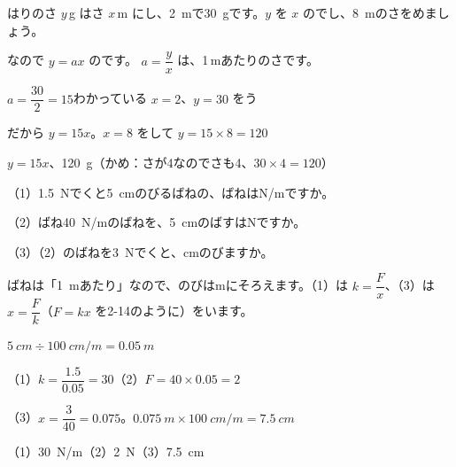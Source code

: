 \begin{kotoba}
\small
{}
\end{kotoba}


\begin{reidai}[\R{比例}{ひ|れい}の\R{式}{しき}を\R{作}{つく}る]
はりのさ $y$\,g はさ $x$\,m にし、\qty{2}{m}で\qty{30}{g}です。$y$ を $x$ のでし、\qty{8}{m}のさをめましょう。\par
\kangaekata {}なので $y=ax$ のです。 $a=\dfrac{y}{x}$ は、1\,mあたりのさです。\par
\shiki $a=\dfrac{30}{2}=15$\quad わかっている $x=2$、$y=30$ をう\par
\hspace*{2.6\zw}だから $y=15x$。$x=8$ をして $y=15\times8=120$\par
\kotae $y=15x$、\qty{120}{g}（かめ：さが4なのでさも4、$30\times4=120$）
\end{reidai}

\begin{reidai}[ばねの\R{力}{ちから} $F=kx$]
（1）\qty{1.5}{N}でくと\qty{5}{cm}のびるばねの、ばねはN/mですか。\par
（2）ばね\qty{40}{N/m}のばねを、\qty{5}{cm}のばすはNですか。\par
（3）（2）のばねを\qty{3}{N}でくと、cmのびますか。\par
\kangaekata ばねは「\qty{1}{m}あたり」なので、のびはmにそろえます。（1）は $k=\dfrac{F}{x}$、（3）は $x=\dfrac{F}{k}$（$F=kx$ を2-14のように）をいます。\par
\shiki $\qty{5}{cm}\div\qty{100}{cm/m}=\qty{0.05}{m}$\par
\hspace*{2.6\zw}（1）\nobreak$k=\dfrac{1.5}{0.05}=30$\quad（2）\nobreak$F=40\times0.05=2$\par
\hspace*{2.6\zw}（3）\nobreak$x=\dfrac{3}{40}=0.075$。$\qty{0.075}{m}\times\qty{100}{cm/m}=\qty{7.5}{cm}$\par
\kotae（1）\nobreak\qty{30}{N/m}\quad（2）\nobreak\qty{2}{N}\quad（3）\nobreak\qty{7.5}{cm}
\end{reidai}

